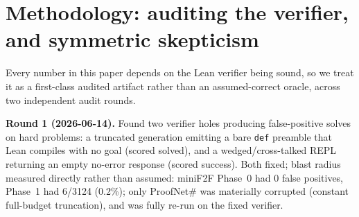 \documentclass{article}
\begin{document}
\section{Methodology: auditing the verifier, and symmetric skepticism}
\label{sec:methodology}

Every number in this paper depends on the Lean verifier being sound, so we treat it as a first-class
audited artifact rather than an assumed-correct oracle, across two independent audit rounds.

\textbf{Round 1 (2026-06-14).} Found two verifier holes producing false-positive solves on hard
problems: a truncated generation emitting a bare \texttt{def} preamble that Lean compiles with no goal
(scored solved), and a wedged/cross-talked REPL returning an empty no-error response (scored success).
Both fixed; blast radius measured directly rather than assumed: miniF2F Phase~0 had 0 false positives,
Phase~1 had 6/3124 (0.2\%); only ProofNet\# was materially corrupted (constant full-budget truncation),
and was fully re-run on the fixed verifier.
\end{document}

